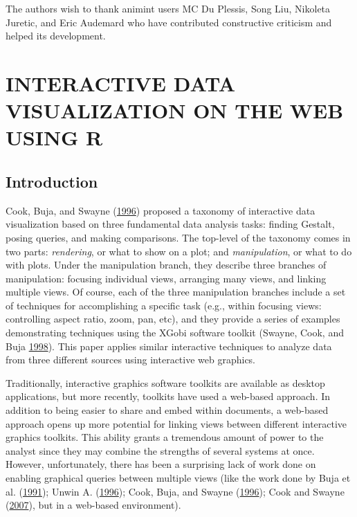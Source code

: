 \documentclass[12pt,]{isuthesis}
\begin{document}
The authors wish to thank animint users MC Du Plessis, Song Liu,
Nikoleta Juretic, and Eric Audemard who have contributed constructive
criticism and helped its development.

\chapter{INTERACTIVE DATA VISUALIZATION ON THE WEB USING R}

\section{Introduction}\label{introduction-1}

Cook, Buja, and Swayne (\protect\hyperlink{ref-Cook:2007uk}{1996})
proposed a taxonomy of interactive data visualization based on three
fundamental data analysis tasks: finding Gestalt, posing queries, and
making comparisons. The top-level of the taxonomy comes in two parts:
\emph{rendering}, or what to show on a plot; and \emph{manipulation}, or
what to do with plots. Under the manipulation branch, they describe
three branches of manipulation: focusing individual views, arranging
many views, and linking multiple views. Of course, each of the three
manipulation branches include a set of techniques for accomplishing a
specific task (e.g., within focusing views: controlling aspect ratio,
zoom, pan, etc), and they provide a series of examples demonstrating
techniques using the XGobi software toolkit (Swayne, Cook, and Buja
\protect\hyperlink{ref-xgobi}{1998}). This paper applies similar
interactive techniques to analyze data from three different sources
using interactive web graphics.

Traditionally, interactive graphics software toolkits are available as
desktop applications, but more recently, toolkits have used a web-based
approach. In addition to being easier to share and embed within
documents, a web-based approach opens up more potential for linking
views between different interactive graphics toolkits. This ability
grants a tremendous amount of power to the analyst since they may
combine the strengths of several systems at once. However,
unfortunately, there has been a surprising lack of work done on enabling
graphical queries between multiple views (like the work done by Buja et
al. (\protect\hyperlink{ref-Buja:1991vh}{1991}); Unwin A.
(\protect\hyperlink{ref-MANET}{1996}); Cook, Buja, and Swayne
(\protect\hyperlink{ref-Cook:2007uk}{1996}); Cook and Swayne
(\protect\hyperlink{ref-ggobi:2007}{2007}), but in a web-based
environment).
\end{document}
